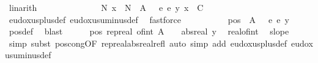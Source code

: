 \begin{isabellebody}
\ linarith\isanewline
\ \ \ \ \ \ \isacommand{{\isacharbraceright}{\kern0pt}}\isamarkupfalse%
\isanewline
\ \ \ \ \ \ \isamarkupfalse%
\ {\isachardoublequoteopen}{\isasymexists}N{\isachardot}{\kern0pt}\ {\isasymforall}x\ {\isasymge}\ N{\isachardot}{\kern0pt}\ {\isacharparenleft}{\kern0pt}{\isacharparenleft}{\kern0pt}{\isacharparenleft}{\kern0pt}{\isacharasterisk}{\kern0pt}{\isacharparenright}{\kern0pt}\ {\isacharparenleft}{\kern0pt}A\ {\isacharplus}{\kern0pt}\ {}{\isacharparenright}{\kern0pt}{\isacharparenright}{\kern0pt}\ {\isacharplus}{\kern0pt}\isactrlsub e\ {\isacharminus}{\kern0pt}\isactrlsub e\ y{\isacharparenright}{\kern0pt}\ x\ {\isasymge}\ C{\isachardoublequoteclose}\ \isamarkupfalse%
\ eudoxus{\isacharunderscore}{\kern0pt}plus{\isacharunderscore}{\kern0pt}def\ eudoxus{\isacharunderscore}{\kern0pt}uminus{\isacharunderscore}{\kern0pt}def\ \isamarkupfalse%
\ fastforce\isanewline
\ \ \ \ \isacommand{{\isacharbraceright}{\kern0pt}}\isamarkupfalse%
\isanewline
\ \ \ \ \isamarkupfalse%
\ {\isachardoublequoteopen}pos\ {\isacharparenleft}{\kern0pt}{\isacharparenleft}{\kern0pt}{\isacharparenleft}{\kern0pt}{\isacharasterisk}{\kern0pt}{\isacharparenright}{\kern0pt}\ {\isacharparenleft}{\kern0pt}A\ {\isacharplus}{\kern0pt}\ {}{\isacharparenright}{\kern0pt}{\isacharparenright}{\kern0pt}\ {\isacharplus}{\kern0pt}\isactrlsub e\ {\isacharminus}{\kern0pt}\isactrlsub e\ y{\isacharparenright}{\kern0pt}{\isachardoublequoteclose}\ \isamarkupfalse%
\ pos{\isacharunderscore}{\kern0pt}def\ \isamarkupfalse%
\ blast\isanewline
\ \ \ \ \isamarkupfalse%
\ {\isachardoublequoteopen}pos\ {\isacharparenleft}{\kern0pt}rep{\isacharunderscore}{\kern0pt}real\ {\isacharparenleft}{\kern0pt}of{\isacharunderscore}{\kern0pt}int\ {\isacharparenleft}{\kern0pt}A\ {\isacharplus}{\kern0pt}\ {}{\isacharparenright}{\kern0pt}\ {\isacharminus}{\kern0pt}\ abs{\isacharunderscore}{\kern0pt}real\ y{\isacharparenright}{\kern0pt}{\isacharparenright}{\kern0pt}{\isachardoublequoteclose}\ \isamarkupfalse%
\ real{\isacharunderscore}{\kern0pt}of{\isacharunderscore}{\kern0pt}int\ \isamarkupfalse%
\ slope\ \isamarkupfalse%
\ {\isacharparenleft}{\kern0pt}simp{\isacharcomma}{\kern0pt}\ subst\ pos{\isacharunderscore}{\kern0pt}cong{\isacharbrackleft}{\kern0pt}OF\ rep{\isacharunderscore}{\kern0pt}real{\isacharunderscore}{\kern0pt}abs{\isacharunderscore}{\kern0pt}real{\isacharunderscore}{\kern0pt}refl{\isacharbrackright}{\kern0pt}{\isacharparenright}{\kern0pt}\ {\isacharparenleft}{\kern0pt}auto\ simp\ add{\isacharcolon}{\kern0pt}\ eudoxus{\isacharunderscore}{\kern0pt}plus{\isacharunderscore}{\kern0pt}def\ eudoxus{\isacharunderscore}{\kern0pt}uminus{\isacharunderscore}{\kern0pt}def{\isacharparenright}{\kern0pt}\isanewline

\end{isabellebody}
